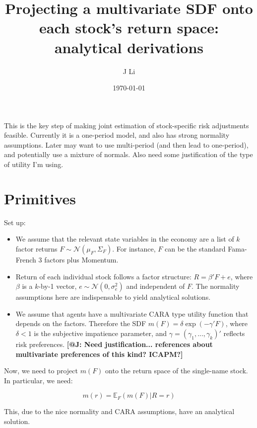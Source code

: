 \documentclass[pdftex,12pt,a4paper]{article}
\makeatletter
\newcommand{\comment}[1]{\textbf{[@J: #1]}}
\makeatother
\begin{document}
\title{Projecting a multivariate SDF onto each stock's return space: analytical derivations}
\author{J Li}
\date{\today}
\maketitle

\abstract

This is the key step of making joint estimation of stock-specific risk adjustments feasible. Currently it is a one-period model, and also has strong normality assumptions. Later may want to use multi-period (and then lead to one-period), and potentially use a mixture of normals. Also need some justification of the type of utility I'm using. 

\section{Primitives}

Set up: 

\begin{itemize}
\item We assume that the relevant state variables in the economy are a list of $k$ factor returns $F \sim \mathcal{N}(\mu_F, \Sigma_F)$. For instance, $F$ can be the standard Fama-French 3 factors plus Momentum. 
\item Return of each individual stock follows a factor structure: $R = \beta' F + e$, where $\beta$ is a $k$-by-1 vector, $e \sim \mathcal{N}(0, \sigma^2_e)$ and independent of $F$. The normality assumptions here are indispensable to yield analytical solutions. 
\item We assume that agents have a multivariate CARA type utility function that depends on the factors. Therefore the SDF $m(F) = \delta \exp(-\gamma' F)$, where $\delta < 1$ is the subjective impatience parameter, and $\gamma = (\gamma_1, ..., \gamma_k)'$ reflects risk preferences. \comment{Need justification... references about multivariate preferences of this kind? ICAPM?}
\end{itemize}

Now, we need to project $m(F)$ onto the return space of the single-name stock. In particular, we need: 

\begin{equation}
m(r) = \mathbb{E}_F(m(F) | R = r)
\end{equation}

This, due to the nice normality and CARA assumptions, have an analytical solution. 
\end{document}
